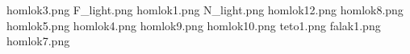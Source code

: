 homlok3.png
F_light.png
homlok1.png
N_light.png
homlok12.png
homlok8.png
homlok5.png
homlok4.png
homlok9.png
homlok10.png
teto1.png
falak1.png
homlok7.png
